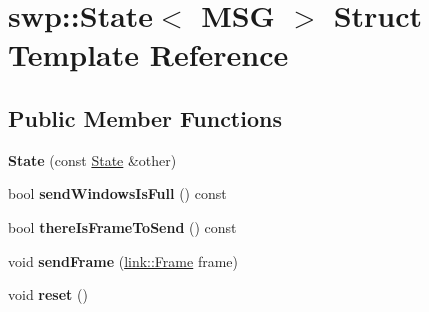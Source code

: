 \hypertarget{structswp_1_1State}{}\section{swp\+:\+:State$<$ M\+SG $>$ Struct Template Reference}
\label{structswp_1_1State}
\subsection*{Public Member Functions}
\begin{DoxyCompactItemize}
\item 
{\bfseries State} (const \hyperlink{structswp_1_1State}{State} \&other)\hypertarget{structswp_1_1State_a2eb6824bd9f7bfa5e84b402ce3915334}{}\label{structswp_1_1State_a2eb6824bd9f7bfa5e84b402ce3915334}

\item 
bool {\bfseries send\+Windows\+Is\+Full} () const \hypertarget{structswp_1_1State_ad932ee3326683cbee09e8a8b36f26b9b}{}\label{structswp_1_1State_ad932ee3326683cbee09e8a8b36f26b9b}

\item 
bool {\bfseries there\+Is\+Frame\+To\+Send} () const \hypertarget{structswp_1_1State_a5a9c617b0cf8b06e442d10b6e3d98143}{}\label{structswp_1_1State_a5a9c617b0cf8b06e442d10b6e3d98143}

\item 
void {\bfseries send\+Frame} (\hyperlink{structlink_1_1Frame}{link\+::\+Frame} frame)\hypertarget{structswp_1_1State_adc781763914d3d1de3ff5c462f1f76ef}{}\label{structswp_1_1State_adc781763914d3d1de3ff5c462f1f76ef}

\item 
void {\bfseries reset} ()\hypertarget{structswp_1_1State_a02c83f258bba472f268c119768147def}{}\label{structswp_1_1State_a02c83f258bba472f268c119768147def}

\end{DoxyCompactItemize}
